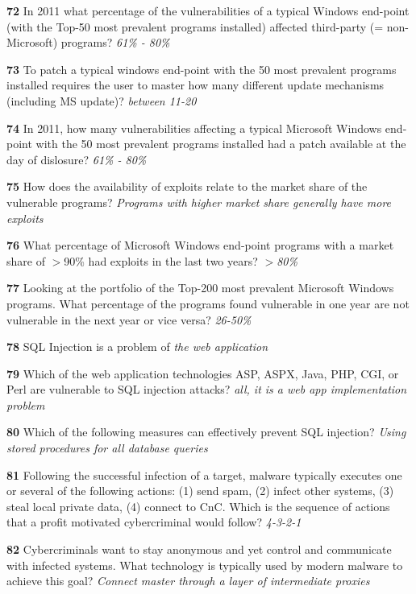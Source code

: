 \textbf{  72}  In 2011 what percentage of the vulnerabilities of a typical Windows end-point (with the Top-50 most prevalent programs installed) affected third-party (= non-Microsoft) programs? 
\textit{ 61\% - 80\%}

\textbf{  73}  To patch a typical windows end-point with the 50 most prevalent programs installed requires the user to master how many different update mechanisms (including MS update)? 
\textit{ between 11-20}

\textbf{  74}  In 2011, how many vulnerabilities affecting a typical Microsoft Windows end-point with the 50 most prevalent programs installed had a patch available at the day of dislosure? 
\textit{ 61\% - 80\%}

\textbf{  75}  How does the availability of exploits relate to the market share of the vulnerable programs? 
\textit{ Programs with higher market share generally have more exploits}

\textbf{  76}  What percentage of Microsoft Windows end-point programs with a market share of $>$90\% had exploits in the last two years? 
\textit{ $>$80\%}

\textbf{  77}  Looking at the portfolio of the Top-200 most prevalent Microsoft Windows programs. What percentage of the programs found vulnerable in one year are not vulnerable in the next year or vice versa?  
\textit{ 26-50\%}

\textbf{  78}  SQL Injection is a problem of  
\textit{ the web application}

\textbf{  79}  Which of the web application technologies ASP, ASPX, Java, PHP, CGI, or Perl are vulnerable to SQL injection attacks? 
\textit{ all, it is a web app implementation problem}

\textbf{  80}  Which of the following measures can effectively prevent SQL injection?  
\textit{ Using stored procedures for all database queries}

\textbf{  81}  Following the successful infection of a target, malware typically executes one or several of the following actions: (1) send spam, (2) infect other systems, (3) steal local private data, (4) connect to CnC. Which is the sequence of actions that a profit motivated cybercriminal would follow?  
\textit{ 4-3-2-1}

\textbf{  82}  Cybercriminals want to stay anonymous and yet control and communicate with infected systems. What technology is typically used by modern malware to achieve this goal? 
\textit{ Connect master through a layer of intermediate proxies}


